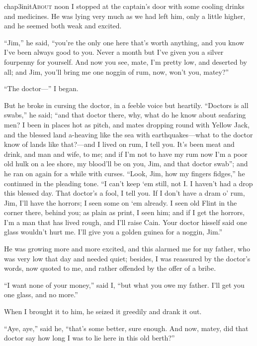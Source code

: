 
   \lettrine[lines=4,image=true]{chap3initA}{bout} noon I stopped at the captain’s door with some cooling drinks and medicines. He was lying very much as we had left him, only a little higher, and he seemed both weak and excited.

\enquote{Jim,} he said, \enquote{you’re the only one here that’s worth anything, and you know I’ve been always good to you. Never a month but I’ve given you a silver fourpenny for yourself. And now you see, mate, I’m pretty low, and deserted by all; and Jim, you’ll bring me one noggin of rum, now, won’t you, matey?}

\enquote{The doctor---} I began.

But he broke in cursing the doctor, in a feeble voice but heartily. \enquote{Doctors is all swabs,} he said; \enquote{and that doctor there, why, what do he know about seafaring men? I been in places hot as pitch, and mates dropping round with Yellow Jack, and the blessed land a-heaving like the sea with earthquakes---what to the doctor know of lands like that?---and I lived on rum, I tell you. It’s been meat and drink, and man and wife, to me; and if I’m not to have my rum now I’m a poor old hulk on a lee shore, my blood’ll be on you, Jim, and that doctor swab}; and he ran on again for a while with curses. \enquote{Look, Jim, how my fingers fidges,} he continued in the pleading tone. \enquote{I can’t keep `em still, not I. I haven’t had a drop this blessed day. That doctor’s a fool, I tell you. If I don’t have a dram o’ rum, Jim, I’ll have the horrors; I seen some on `em already. I seen old Flint in the corner there, behind you; as plain as print, I seen him; and if I get the horrors, I’m a man that has lived rough, and I’ll raise Cain. Your doctor hisself said one glass wouldn’t hurt me. I’ll give you a golden guinea for a noggin, Jim.}

He was growing more and more excited, and this alarmed me for my father, who was very low that day and needed quiet; besides, I was reassured by the doctor’s words, now quoted to me, and rather offended by the offer of a bribe.

\enquote{I want none of your money,} said I, \enquote{but what you owe my father. I’ll get you one glass, and no more.}

When I brought it to him, he seized it greedily and drank it out.

\enquote{Aye, aye,} said he, \enquote{that’s some better, sure enough. And now, matey, did that doctor say how long I was to lie here in this old berth?}

